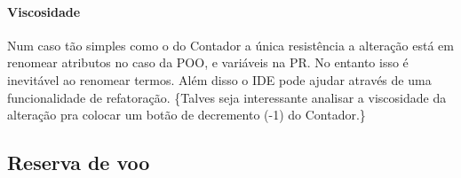 \paragraph{Viscosidade}
\label{sec:orge0e0aa6}
Num caso tão simples como o do Contador a única resistência a alteração
está em renomear atributos no caso da POO, e variáveis na PR.
No entanto isso é inevitável ao renomear termos.
Além disso o IDE pode ajudar através de uma funcionalidade de refatoração.
\todo\{Talves seja interessante analisar a viscosidade da alteração pra
colocar um botão de decremento (-1) do Contador.\}

\subsection{Reserva de voo}
\label{sec:org2312dd5}
